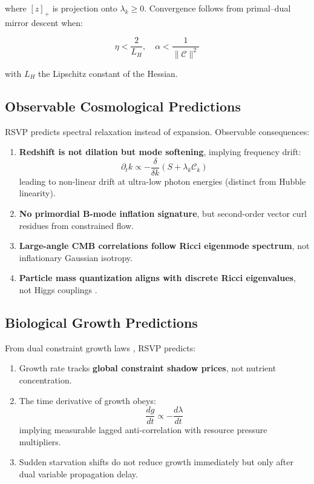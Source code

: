 \documentclass[11pt,a4paper]{article}
\begin{document}
where \([z]_+\) is projection onto \(\lambda_k \ge 0\). Convergence follows from primal–dual mirror descent \citep{Boyd2004} when:

\begin{equation}
\eta < \frac{2}{L_H}, \quad \alpha < \frac{1}{\|\mathcal{C}\|^2}
\end{equation}

with \(L_H\) the Lipschitz constant of the Hessian.

\subsection{Observable Cosmological Predictions}

RSVP predicts spectral relaxation instead of expansion. Observable consequences:

\begin{enumerate}
    \item \textbf{Redshift is not dilation but mode softening}, implying frequency drift:
    \begin{equation}
    \partial_t k \propto - \frac{\delta}{\delta k} (S + \lambda_k \mathcal{C}_k)
    \end{equation}
    leading to non-linear drift at ultra-low photon energies (distinct from Hubble linearity).

    \item \textbf{No primordial B-mode inflation signature}, but second-order vector curl residues from constrained flow.

    \item \textbf{Large-angle CMB correlations follow Ricci eigenmode spectrum}, not inflationary Gaussian isotropy.

    \item \textbf{Particle mass quantization aligns with discrete Ricci eigenvalues}, not Higgs couplings \citep{Pincak2025}.
\end{enumerate}

\subsection{Biological Growth Predictions}

From dual constraint growth laws \citep{Yamagishi2025}, RSVP predicts:

\begin{enumerate}
    \item Growth rate tracks \textbf{global constraint shadow prices}, not nutrient concentration.
    \item The time derivative of growth obeys:
    \begin{equation}
    \frac{d g}{dt} \propto -\frac{d\lambda}{dt}
    \end{equation}
    implying measurable lagged anti-correlation with resource pressure multipliers.
    \item Sudden starvation shifts do not reduce growth immediately but only after dual variable propagation delay.
\end{enumerate}
\end{document}
